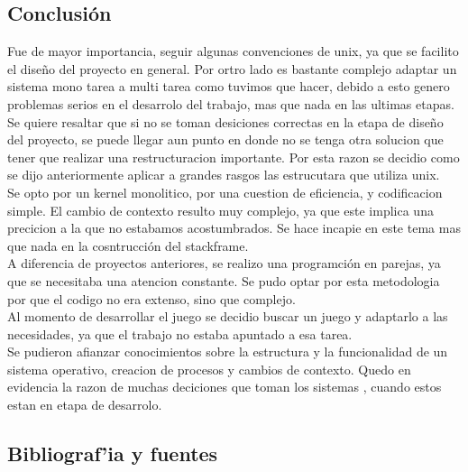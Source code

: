 \documentclass[10pt,a4paper]{article}
\begin{document}
\subsection{Conclusi\'on}
Fue de mayor importancia, seguir algunas convenciones de unix, ya que se facilito el dise\~no del proyecto en general. Por ortro lado es bastante complejo adaptar un sistema mono tarea a multi tarea como tuvimos que hacer, debido a esto genero problemas serios en el desarrolo del trabajo, mas que nada en las ultimas etapas. Se quiere resaltar que si  no se toman desiciones correctas en la etapa de dise\~no del proyecto, se puede llegar aun punto en donde no se tenga otra solucion que tener que realizar una restructuracion importante. Por esta razon se decidio como se dijo anteriormente aplicar a grandes rasgos las estrucutara que utiliza unix.\\
Se opto por un kernel monolitico, por una cuestion de eficiencia, y codificacion simple. El cambio de contexto resulto muy complejo, ya que este implica una precicion a la que no estabamos acostumbrados. Se hace incapie en este tema mas que nada en la cosntrucci\'on del stackframe.\\
A diferencia de proyectos anteriores, se realizo una programci\' on en parejas, ya que se necesitaba una atencion constante. Se pudo optar por esta metodologia por que el codigo no era extenso, sino que complejo.\\
Al momento de desarrollar el juego se decidio buscar un juego y adaptarlo a las necesidades, ya que el trabajo no estaba apuntado a esa tarea.\\
Se pudieron afianzar conocimientos sobre la estructura y la funcionalidad de un sistema operativo,  creacion de procesos  y cambios de contexto. Quedo en evidencia la razon de muchas deciciones que toman los sistemas , cuando estos estan en etapa de desarrolo.\\ 


\subsection{Bibliograf'ia y fuentes}
\end{document}
